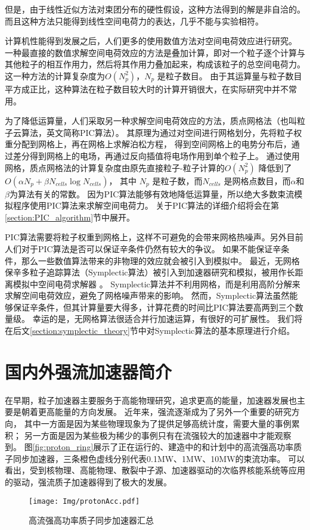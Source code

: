 但是，由于线性近似方法对束团分布的硬性假设，这种方法得到的解是非自洽的。
而且这种方法只能得到线性空间电荷力的表达，几乎不能与实验相符。

计算机性能得到发展之后，人们更多的使用数值方法对空间电荷效应进行研究。
一种最直接的数值求解空间电荷效应的方法是叠加计算，即对一个粒子逐个计算与其他粒子的相互作用力，然后将其作用力叠加起来，构成该粒子的总空间电荷力。
这一种方法的计算复杂度为$O(N_p^2)$，$N_p$ 是粒子数目。
由于其运算量与粒子数目平方成正比，这种算法在粒子数目较大时的计算开销很大，在实际研究中并不常用。

为了降低运算量，人们采取另一种求解空间电荷效应的方法，质点网格法（也叫粒子云算法，英文简称PIC算法）。
其原理为通过对空间进行网格划分，先将粒子权重分配到网格上，再在网格上求解泊松方程，
得到空间网格上的电势分布后，通过差分得到网格上的电场，再通过反向插值将电场作用到单个粒子上。
通过使用网格，质点网格法的计算复杂度由原先直接粒子-粒子计算的$O(N_p^2)$ 降低到了$O(\alpha N_p + \beta N_{cells}\log{N_{cells}})$，
其中 $N_p$ 是粒子数，而$N_{cells}$ 是网格点数目，而$\alpha$和$\beta$为算法有关的常数。
因为PIC算法能够有效地降低运算量，所以绝大多数束流模拟程序使用PIC算法来求解空间电荷力。
关于PIC算法的详细介绍将会在第\eqref{section:PIC_algorithm}节中展开。

PIC算法需要将粒子权重到网格上，这样不可避免的会带来网格热噪声。另外目前人们对于PIC算法是否可以保证辛条件仍然有较大的争议。
如果不能保证辛条件，那么一些数值算法带来的非物理的效应就会被引入到模拟中。
最近，无网格保辛多粒子追踪算法（Symplectic算法）被引入到加速器研究和模拟，被用作长距离模拟中空间电荷求解器 \cite{symplectic_ji2017}。
Symplectic算法并不利用网格，而是利用高阶分解来求解空间电荷效应，避免了网格噪声带来的影响。
然而，Symplectic算法虽然能够保证辛条件，但其计算量要大得多，计算花费的时间比PIC算法要高两到三个数量级。
幸运的是，无网格算法很适合并行加速运算，有很好的可扩展性。
我们将在后文\eqref{section:symplectic_theory}节中对Symplectic算法的基本原理进行介绍。

\section{国内外强流加速器简介}
在早期，粒子加速器主要服务于高能物理研究，追求更高的能量，加速器发展也主要是朝着更高能量的方向发展。
近年来，强流逐渐成为了另外一个重要的研究方向，
其中一方面是因为某些物理现象为了提供足够高统计度，需要大量的事例累积；
另一方面是因为某些极为稀少的事例只有在流强较大的加速器中才能观察到。
图\eqref{fig:proton_ring}展示了正在运行的、建造中的和计划中的高流强高功率质子同步加速器\cite{tang2011proton}，三条橙色虚线分别代表0.1MW、1MW、10MW的束流功率。
可以看出，受到核物理、高能物理、散裂中子源、加速器驱动的次临界核能系统等应用的驱动，强流质子加速器得到了极大的发展。
\begin{figure}[!htb]
    \centering
    \texttt{[image: Img/protonAcc.pdf]}
    \caption{高流强高功率质子同步加速器汇总}
    \label{fig:proton_ring}
\end{figure}


